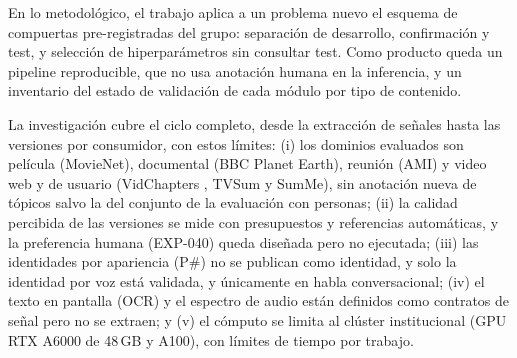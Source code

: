 En lo metodológico, el trabajo aplica a un problema nuevo el esquema de compuertas
pre-registradas del grupo: separación de desarrollo, confirmación y test, y selección de
hiperparámetros sin consultar test. Como producto queda un pipeline reproducible, que no
usa anotación humana en la inferencia, y un inventario del estado de validación de cada
módulo por tipo de contenido.


La investigación cubre el ciclo completo, desde la extracción de señales hasta las versiones
por consumidor, con estos límites:
(i) los dominios evaluados son película (MovieNet), documental (BBC Planet Earth), reunión
(AMI) y video web y de usuario (VidChapters \cite{ventura2024vidchapters}, TVSum y SumMe),
sin anotación nueva de tópicos salvo la del conjunto de la evaluación con personas;
(ii) la calidad percibida de las versiones se mide con presupuestos y referencias
automáticas, y la preferencia humana (EXP-040) queda diseñada pero no ejecutada;
(iii) las identidades por apariencia (P\#) no se publican como identidad, y solo la identidad
por voz está validada, y únicamente en habla conversacional;
(iv) el texto en pantalla (OCR) y el espectro de audio están definidos como contratos de
señal pero no se extraen; y
(v) el cómputo se limita al clúster institucional (GPU RTX A6000 de 48\,GB y A100),
con límites de tiempo por trabajo.
